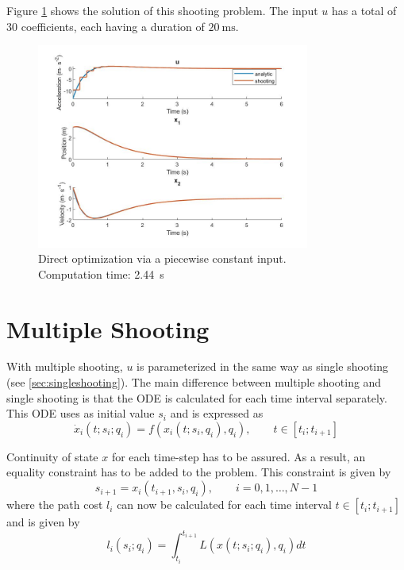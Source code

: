 \par Figure \ref{fig:solution_zoh} shows the solution of this shooting problem. The input $u$ has a total of 30 coefficients, each having a duration of $\SI{20}{\milli\second}$.

\begin{figure}[h!]
\centering
\includegraphics[width=0.8\textwidth]{Images/solution_zoh.jpg}
\caption{Direct optimization via a piecewise constant input.\\ Computation time: \SI{2.44}{\second}}
\label{fig:solution_zoh}
\end{figure}


\section{Multiple Shooting}

\par With multiple shooting, $u$ is parameterized in the same way as single shooting (see \ref{sec:singleshooting}). The main difference between multiple shooting and single shooting is that the ODE is calculated for each time interval separately. This ODE uses as initial value $s_i$ and is expressed as
\begin{equation}
    \dot{x}_i (t; s_i; q_i) = f(x_i(t;s_i,q_i),q_i), \qquad t\in [t_i; t_{i+1}]
    \label{eq:ode_multiple}
\end{equation}

\par Continuity of state $x$ for each time-step has to be assured. As a result, an equality constraint has to be added to the problem. This constraint is given by 
\begin{equation}
    \label{eq:shooting_constraint}
    s_{i+1} = x_i (t_{i+1}, s_i, q_i), \qquad i = 0,1,\dots, N-1
\end{equation}
where the path cost $l_i$ can now be calculated for each time interval $t \in [t_i; t_{i+1}]$ and is given by
\begin{equation}
    l_i(s_i;q_i) = \int_{t_i}^{t_{i+1}} L(x(t;s_i;q_i),q_i)dt 
\end{equation}

